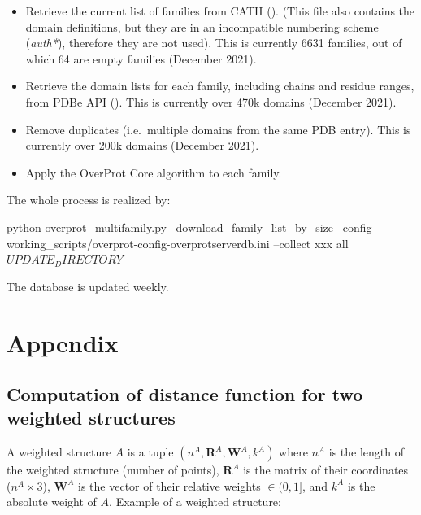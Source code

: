 \documentclass{article}
\begin{document}
\begin{itemize}
\item
  Retrieve the current list of families from CATH
  ().
  (This file also contains the domain definitions, but they are in an
  incompatible numbering scheme (\emph{auth*}), therefore they are not
  used). This is currently 6631 families, out of which 64 are empty
  families (December 2021).
\item
  Retrieve the domain lists for each family, including chains and
  residue ranges, from PDBe API
  (). This is
  currently over 470k domains (December 2021).
\item
  Remove duplicates (i.e.~multiple domains from the same PDB entry).
  This is currently over 200k domains (December 2021).
\item
  Apply the OverProt Core algorithm to each family.
\end{itemize}

The whole process is realized by:

\begin{codeblock}
    python  overprot_multifamily.py  --download_family_list_by_size
    --config working_scripts/overprot-config-overprotserverdb.ini
    --collect  xxx  all  $UPDATE_DIRECTORY                                                     $
\end{codeblock}

The database is updated weekly.



\section{Appendix}



\subsection{Computation of distance function for two weighted structures}

A weighted structure \(A\) is a tuple
\( (n^A, \mathbf{R}^A, \mathbf{W}^A, k^A) \) where \(n^A\) is the length
of the weighted structure (number of points), \(\mathbf{R}^A\) is the
matrix of their coordinates (\(n^A \times 3\)), \(\mathbf{W}^A\) is the
vector of their relative weights \(\in (0,1]\), and \(k^A\) is the
absolute weight of \(A\). Example of a weighted structure:
\end{document}
